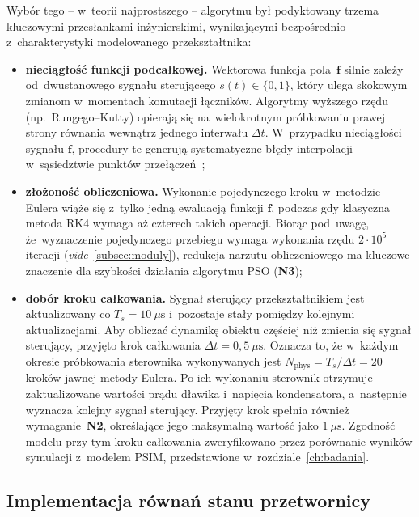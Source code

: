 Wybór tego -- w~teorii najprostszego -- algorytmu był podyktowany trzema kluczowymi przesłankami inżynierskimi, wynikającymi bezpośrednio z~charakterystyki modelowanego przekształtnika:

\begin{itemize}
    \item \textbf{nieciągłość funkcji podcałkowej.} Wektorowa funkcja pola~$\mathbf{f}$ silnie zależy od~dwustanowego sygnału sterującego $s(t)\in\{0,1\}$, który ulega skokowym zmianom w~momentach komutacji łączników. Algorytmy wyższego rzędu (np.~Rungego--Kutty) opierają się na~wielokrotnym próbkowaniu prawej strony równania wewnątrz jednego interwału $\Delta t$. W~przypadku nieciągłości sygnału $\mathbf{f}$, procedury te generują systematyczne błędy interpolacji w~sąsiedztwie punktów przełączeń~\cite{hairer1993};
    \item \textbf{złożoność obliczeniowa.} Wykonanie pojedynczego kroku w~metodzie Eulera wiąże się z~tylko jedną ewaluacją funkcji $\mathbf{f}$, podczas gdy klasyczna metoda RK4 wymaga aż czterech takich operacji. Biorąc pod~uwagę, że~wyznaczenie pojedynczego przebiegu wymaga wykonania rzędu $2\cdot 10^5$ iteracji (\textit{vide}~\ref{subsec:moduly}), redukcja narzutu obliczeniowego ma kluczowe znaczenie dla szybkości działania algorytmu PSO (\textbf{N3});
    \item \textbf{dobór kroku całkowania.} Sygnał sterujący przekształtnikiem jest aktualizowany co $T_s = 10~\mu\mathrm{s}$ i~pozostaje stały pomiędzy kolejnymi aktualizacjami. Aby obliczać dynamikę obiektu częściej niż zmienia się sygnał sterujący, przyjęto krok całkowania $\Delta t = 0{,}5~\mu\mathrm{s}$. Oznacza to, że w~każdym okresie próbkowania sterownika wykonywanych jest $N_{\mathrm{phys}} = T_s/\Delta t = 20$ kroków jawnej metody Eulera. Po ich wykonaniu sterownik otrzymuje zaktualizowane wartości prądu dławika i~napięcia kondensatora, a~następnie wyznacza kolejny sygnał sterujący. Przyjęty krok spełnia również wymaganie~\textbf{N2}, określające jego maksymalną wartość jako $1~\mu\mathrm{s}$. Zgodność modelu przy tym kroku całkowania zweryfikowano przez porównanie wyników symulacji z~modelem PSIM, przedstawione w~rozdziale~\ref{ch:badania}.
\end{itemize}

\subsection{Implementacja równań stanu przetwornicy}
\label{subsec:rownania}

